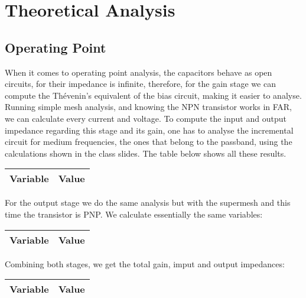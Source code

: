 \newpage

\section{Theoretical Analysis}
\label{sec:analysis}

\subsection{Operating Point}

When it comes to operating point analysis, the capacitors behave as open circuits, for their impedance is infinite, therefore, for the gain stage we can compute the Thévenin's equivalent of the bias circuit, making it easier to analyse. Running simple mesh analysis, and knowing the NPN transistor works in FAR, we can calculate every current and voltage.
To compute the input and output impedance regarding this stage and its gain, one has to analyse the incremental circuit for medium frequencies, the ones that belong to the passband, using the calculations shown in the class slides. The table below shows all these results.

\begin{center}
\begin{tabular}{|l|r|}
  \hline    
  {\bf Variable} & {\bf Value} \\ \hline
  
\end{tabular}
\end{center}

For the output stage we do the same analysis but with the supermesh and this time the transistor is PNP. We calculate essentially the same variables:

\begin{center}
\begin{tabular}{|l|r|}
  \hline    
  {\bf Variable} & {\bf Value} \\ \hline
  
\end{tabular}
\end{center}


Combining both stages, we get the total gain, imput and output impedances:

\begin{center}
\begin{tabular}{|l|r|}
  \hline    
  {\bf Variable} & {\bf Value} \\ \hline
  
\end{tabular}
\end{center}




